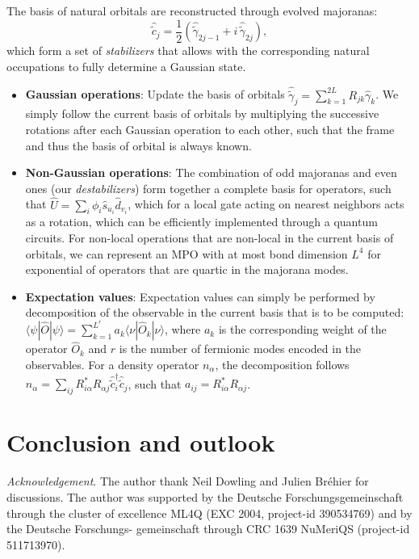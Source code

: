 \documentclass[a4paper, twocolumn, superscriptaddress, longbibliography]{revtex4-2}
\begin{document}
	The basis of natural orbitals are reconstructed through evolved majoranas:
	\begin{equation}
		\hat{\tilde{c}}_{j} = \frac{1}{2}\left(\hat{\tilde{\gamma}}_{2j-1} + i\,\hat{\tilde{\gamma}}_{2j}\right),
	\end{equation}
	which form a set of \emph{stabilizers} that allows with the corresponding natural occupations to fully determine a Gaussian state.
	\begin{itemize}
		\item {\bf Gaussian operations}: Update the basis of orbitals $\hat{\tilde{\gamma}}_j = \sum_{k=1}^{2L} R_{jk}\hat{\gamma}_{k}$. We simply follow the current basis of orbitals by multiplying the successive rotations after each Gaussian operation to each other, such that the frame and thus the basis of orbital is always known.
		\item {\bf Non-Gaussian operations}: The combination of odd majoranas and even ones (our \emph{destabilizers}) form together a complete basis for operators, such that $\hat{U} = \sum_{i} \phi_{i} \hat{s}_{u_i}\hat{d}_{v_i}$, which for a local gate acting on nearest neighbors acts as a rotation, which can be efficiently implemented through a quantum circuits. For non-local operations that are non-local in the current basis of orbitals, we can represent an MPO with at most bond dimension $L^{4}$ for exponential of operators that are quartic in the majorana modes. 
		\item {\bf Expectation values}: Expectation values can simply be performed by decomposition of the observable in the current basis that is to be computed: $\langle \psi | \hat{O} | \psi \rangle = \sum_{k=1}^{L^{r}} a_{k}\langle \nu | \hat{O}_k | \nu \rangle$, where $a_k$ is the corresponding weight of the operator $\hat{O}_{k}$ and $r$ is the number of fermionic modes encoded in the observables. For a density operator $n_\alpha$, the decomposition follows $n_\alpha = \sum_{ij} R^{*}_{i\alpha} R_{\alpha j} \hat{\tilde{c}}^{\dagger}_{i}\hat{\tilde{c}}^{}_{j}$, such that $a_{ij} = R^{*}_{i\alpha} R_{\alpha j}$.
	\end{itemize}

	\section{Conclusion and outlook}

	\textit{Acknowledgement}. The author thank Neil Dowling and Julien Bréhier for discussions. The author was supported by the Deutsche Forschungsgemeinschaft through the cluster of excellence ML4Q (EXC 2004, project-id 390534769) and by the Deutsche Forschungs- gemeinschaft through CRC 1639 NuMeriQS (project-id 511713970).

	

           \begin{appendices}

	\end{appendices}
\end{document}
